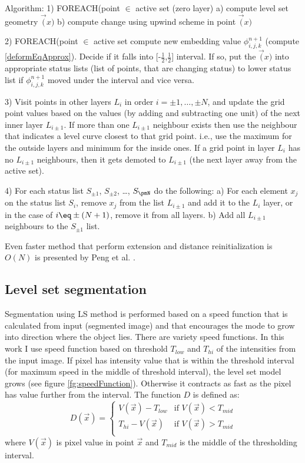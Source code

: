 Algorithm:
\label{alg:sparseFileld}
1) FOREACH(point $\in$ active set (zero layer)
  a) compute level set geometry $\vec(x)$
  b) compute change using upwind scheme in point $\vec(x)$

2) FOREACH(point $\in$ active set compute new embedding value $\phi_{i,j,k}^{n+1}$ (compute \ref{deformEqApprox}).
Decide if it falls into [-$\frac{1}{2}$,$\frac{1}{2}$] interval.
If so, put the $\vec(x)$ into appropriate status lists (list of points, that are changing status) to lower status list if $\phi_{i,j,k}^{n+1}$ moved under the interval and vice versa.

3) Visit points in other layers $L_i$ in order $i=\pm 1,\ldots, \pm N$, and update the grid point values based on the values (by adding and subtracting one unit) of the next inner layer $L_{i\pm1}$.
If more than one $L_{i\pm1}$ neighbour exists then use the neighbour that indicates a level curve closest to that grid point. i.e., use the maximum for the outside layers and minimum for the inside ones.
If a grid point in layer $L_i$ has no $L_{i\pm1}$ neighbours, then it gets demoted to $L_{i\pm1}$ (the next layer away from the active set).

4) For each status list $S_{\pm1}$, $S_{\pm2}$, \ldots, $S_{\pmN}$ do the following:
  a) For each element $x_j$ on the status list $S_i$, remove $x_j$ from the list $L_{i\pm1}$ and add it to the $L_{i}$ layer, or in the case of $i\eq \pm ( N + 1)$, remove it from all layers.
  b) Add all $L_{i\pm1}$ neighbours to the $S_{\pm1}$ list.

Even faster method that perform extension and distance reinitialization is $O(N)$ is presented by Peng et al. \cite{pengSparseFields}.

\subsection{Level set segmentation}

Segmentation using LS method is performed based on a speed function that is calculated from input (segmented image) and that encourages the mode to grow into direction where the object lies.
There are variety speed functions. In this work I use speed function based on threshold $T_{low}$ and $T_{hi}$ of the intensities from the input image.
If pixel has intensity value that is within the threshold interval (for maximum speed in the middle of threshold interval), the level set model grows (see figure \ref{fg:speedFunction}).
Otherwise it contracts as fast as the pixel has value further from the interval. The function $D$ is defined as:
\begin{equation}
\label{eq:speedFunction}
D(\vec{x}) =
\begin{cases}
V(\vec{x}) - T_{low} & \text{if $V(\vec{x}) < T_{mid}$}\\
T_{hi} - V(\vec{x}) & \text{if $V(\vec{x}) > T_{mid}$}\\
\end{cases}
\end{equation}
where $V(\vec{x})$ is pixel value in point $\vec{x}$ and $T_{mid}$ is the middle of the thresholding interval.

